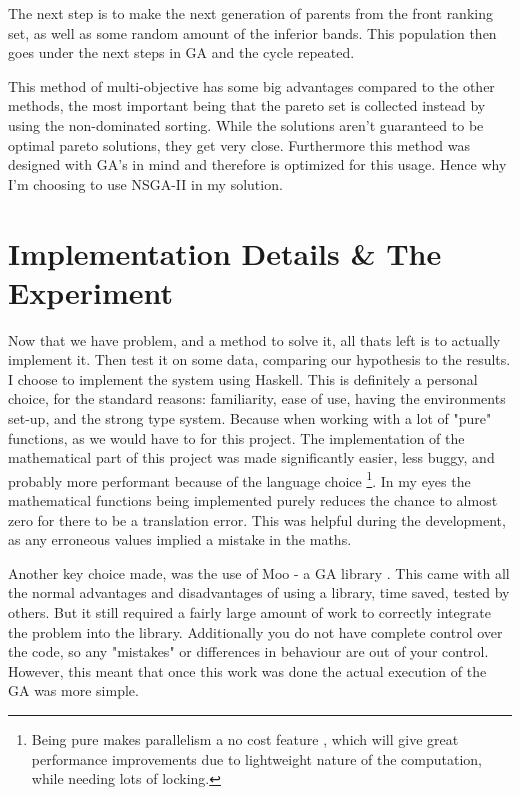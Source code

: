 \documentclass[11pt]{article}
\begin{document}
    The next step is to make the next generation of parents from the front ranking
    set, as well as some random amount of the inferior bands. This population
    then goes under the next steps in GA and the cycle repeated.

    This method of multi-objective has some big advantages compared to the other methods,
    the most important being that the pareto set is collected instead by using the non-dominated
    sorting. While the solutions aren't guaranteed to be optimal pareto solutions, they
    get very close. Furthermore this method was designed with GA's in mind and therefore is
    optimized for this usage. Hence why I'm choosing to use NSGA-II in my solution.


\section{Implementation Details \& The Experiment}

    Now that we have problem, and a method to solve it, all thats left is to actually
    implement it. Then test it on some data, comparing our hypothesis to the results.
    I choose to implement the system using Haskell. This is definitely a personal
    choice, for the standard reasons: familiarity, ease of use, having the environments
    set-up, and the strong type system. Because when working with a lot of "pure"
    functions, as we would have to for this project. The implementation 
    of the mathematical part of this project was made significantly
    easier, less buggy, and probably more performant because of the language choice
    \footnote{Being pure makes parallelism a no cost feature \cite{HarrisMarlowJones, Chakravarty},
    which will give great performance improvements due to lightweight nature of the 
    computation, while needing lots of locking. }.
    In my eyes the mathematical functions
    being implemented purely reduces the chance to almost zero for there to be a translation
    error. This was helpful during the development, as any erroneous values implied a mistake
    in the maths.

    Another key choice made, was the use of Moo - a GA library \cite{Moo}. This came with all
    the normal advantages and disadvantages of using a library, time saved, tested by others.
    But it still required a fairly large amount of work to correctly integrate the
    problem into the library. Additionally you do not have complete control over the code,
    so any "mistakes" or differences in behaviour are out of your control. However,
    this meant that once this work was done the actual execution of the GA was more simple.
\end{document}
